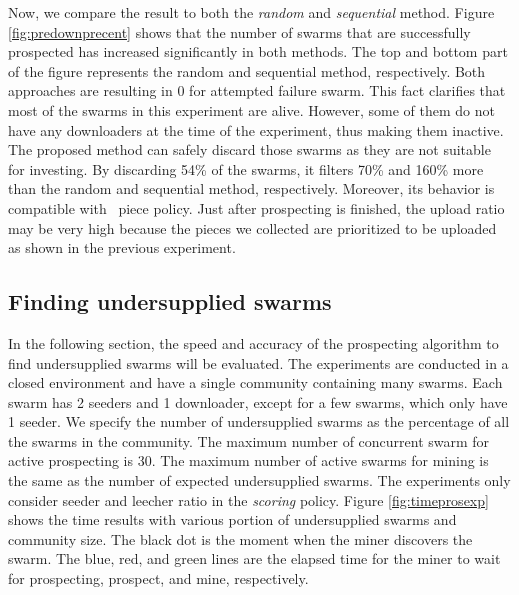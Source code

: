 Now, we compare the result to both the \textit{random} and \textit{sequential} method. Figure \ref{fig:predownprecent} shows that the number of swarms that are successfully prospected has increased significantly in both methods. The top and bottom part of the figure represents the random and sequential method, respectively. Both approaches are resulting in 0 for attempted failure swarm. This fact clarifies that most of the swarms in this experiment are alive. However, some of them do not have any downloaders at the time of the experiment, thus making them inactive. The proposed method can safely discard those swarms as they are not suitable for investing. By discarding 54\% of the swarms, it filters 70\% and 160\% more than the random and sequential method, respectively. Moreover, its behavior is compatible with \bt~piece policy. Just after prospecting is finished, the upload ratio may be very high because the pieces we collected are prioritized to be uploaded as shown in the previous experiment.

\subsection{Finding undersupplied swarms}
In the following section, the speed and accuracy of the prospecting algorithm to find undersupplied swarms will be evaluated. The experiments are conducted in a closed environment and have a single community containing many swarms. Each swarm has 2 seeders and 1 downloader, except for a few swarms, which only have 1 seeder. We specify the number of undersupplied swarms as the percentage of all the swarms in the community. The maximum number of concurrent swarm for active prospecting is 30. The maximum number of active swarms for mining is the same as the number of expected undersupplied swarms. The experiments only consider seeder and leecher ratio in the \textit{scoring} policy. Figure \ref{fig:timeprosexp} shows the time results with various portion of undersupplied swarms and community size. The black dot is the moment when the miner discovers the swarm. The blue, red, and green lines are the elapsed time for the miner to wait for prospecting, prospect, and mine, respectively.

